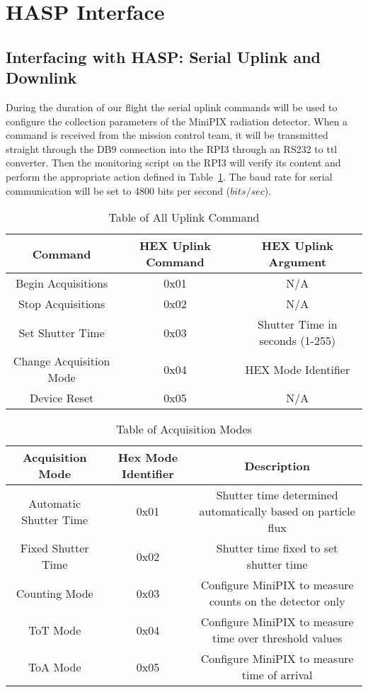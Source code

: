 \section{HASP Interface}
\label{sec:HaspInterface}

\subsection{Interfacing with HASP: Serial Uplink and Downlink}
During the duration of our flight the serial uplink commands will be used to configure the collection parameters of the MiniPIX radiation detector. When a command is received from the mission control team, it will be transmitted straight through the DB9 connection into the RPI3 through an RS232 to ttl converter. Then the monitoring script on the RPI3 will verify its content and perform the appropriate action defined in Table~\ref{tab:All-Commands}. The baud rate for serial communication will be set to 4800 bits per second ($bits/sec$). 


\begin{table}[!ht]
  \centering
  \caption{Table of All Uplink Command} 
  \label{tab:All-Commands}
  \bigskip
  \begin{tabular}{c|c|c}
    \multicolumn{1}{c|}{\bfseries Command} & \multicolumn{1}{c|}{\bfseries HEX Uplink Command} & \multicolumn{1}{c}{\bfseries HEX Uplink Argument}\\
    \hline
    \hline
    Begin Acquisitions & 0x01 & N/A \\ 
    Stop Acquisitions & 0x02 & N/A \\ 
    Set Shutter Time & 0x03 & Shutter Time in seconds (1-255) \\ 
    Change Acquisition Mode & 0x04 & HEX Mode Identifier \\
    Device Reset & 0x05 & N/A \\
  \end{tabular}
  \medskip
\end{table}

\begin{table}[!ht]
  \centering
  \caption{Table of Acquisition Modes} 
  \label{tab:Acq-Commands}
  \bigskip
  \begin{tabular}{c|c|c}
    \multicolumn{1}{c|}{\bfseries Acquisition Mode} & \multicolumn{1}{c|}{\bfseries Hex Mode Identifier} & \multicolumn{1}{c}{\bfseries Description} \\
    \hline
    \hline
    Automatic Shutter Time & 0x01 & Shutter time determined automatically based on particle flux \\
    Fixed Shutter Time & 0x02 & Shutter time fixed to set shutter time \\ 
    Counting Mode & 0x03 & Configure MiniPIX to measure counts on the detector only \\
    ToT Mode & 0x04 & Configure MiniPIX to measure time over threshold values \\
    ToA Mode & 0x05 & Configure MiniPIX to measure time of arrival \\
  \end{tabular}
  \medskip
\end{table}



